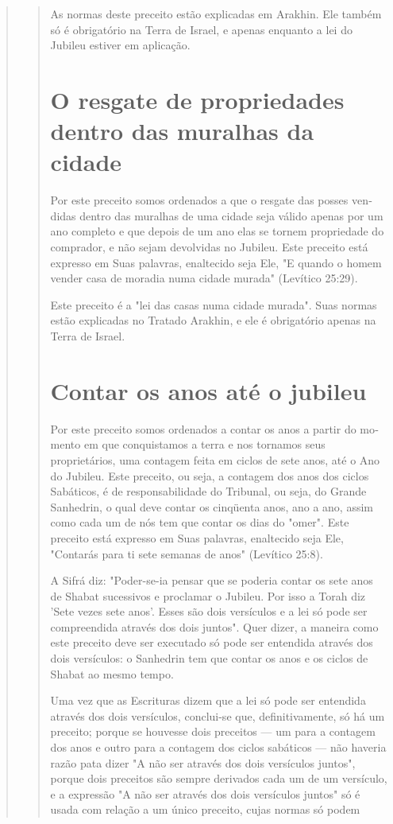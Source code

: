 \begin{quote}
\begin{quote}
As normas deste preceito estão explicadas em Arakhin. Ele também só é
obrigatório na Terra de Israel, e apenas enquanto a lei do Jubileu
estiver em aplicação.

\section{O resgate de propriedades dentro das muralhas da cidade}

Por este preceito somos ordenados a que o resgate das posses ven­didas
dentro das muralhas de uma cidade seja válido apenas por um ano
com­pleto e que depois de um ano elas se tornem propriedade do
comprador, e não sejam devolvidas no Jubileu. Este preceito está
expresso em Suas palavras, enal­tecido seja Ele, "E quando o homem
vender casa de moradia numa cidade mu­rada" (Levítico 25:29).

Este preceito é a "lei das casas numa cidade murada". Suas normas estão
explicadas no Tratado Arakhin, e ele é obrigatório apenas na Terra de
Israel.

\section{Contar os anos até o jubileu}

Por este preceito somos ordenados a contar os anos a partir do mo­mento
em que conquistamos a terra e nos tornamos seus proprietários, uma
contagem feita em ciclos de sete anos, até o Ano do Jubileu. Este
preceito, ou seja, a contagem dos anos dos ciclos Sabáticos, é de
responsabilidade do Tribu­nal, ou seja, do Grande Sanhedrin, o qual deve
contar os cinqüenta anos, ano a ano, assim como cada um de nós tem que
contar os dias do "omer". Este preceito está expresso em Suas palavras,
enaltecido seja Ele, "Contarás para ti sete semanas de anos" (Levítico
25:8).

A Sifrá diz: "Poder-se-ia pensar que se poderia contar os sete anos de
Shabat sucessivos e proclamar o Jubileu. Por isso a Torah diz 'Sete
vezes sete anos'. Esses são dois versículos e a lei só pode ser
compreendida através dos dois juntos". Quer dizer, a maneira como este
preceito deve ser executado só pode ser entendida através dos dois
versículos: o Sanhedrin tem que contar os anos e os ciclos de Shabat ao
mesmo tempo.

Uma vez que as Escrituras dizem que a lei só pode ser entendida atra­vés
dos dois versículos, conclui-se que, definitivamente, só há um preceito;
por­que se houvesse dois preceitos --- um para a contagem dos anos e
outro para a contagem dos ciclos sabáticos --- não haveria razão pata
dizer "A não ser atra­vés dos dois versículos juntos", porque dois
preceitos são sempre derivados cada um de um versículo, e a expressão "A
não ser através dos dois versículos juntos" só é usada com relação a um
único preceito, cujas normas só podem




\end{quote}
\end{quote}
